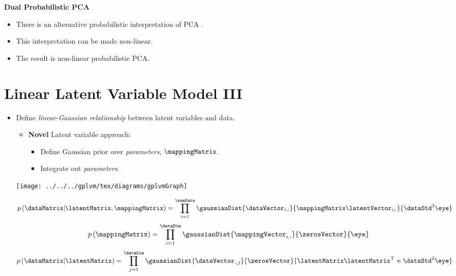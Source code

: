 \textbf{Dual Probabilistic PCA}
\begin{itemize}
\item There is an alternative probabilistic interpretation of PCA \cite{Lawrence:pnpca05}.
\item This interpretation can be made non-linear.
\item The result is non-linear probabilistic PCA.
\end{itemize}

\section{Linear Latent Variable Model III}



\begin{itemize}
\item Define \emph{linear-Gaussian relationship} between latent variables
and data.

\begin{itemize}
\item \textbf{Novel} Latent variable approach:

\begin{itemize}
\item Define Gaussian prior over \emph{parameters}, $\mappingMatrix$.
\item Integrate out \emph{parameters}.
\end{itemize}
\end{itemize}

\begin{center}
\texttt{[image: ../../../gplvm/tex/diagrams/gplvmGraph]}
\par\end{center}

\begin{center}
\[
p\left(\dataMatrix|\latentMatrix,\mappingMatrix\right)=\prod_{i=1}^{\numData}\gaussianDist{\dataVector_{i,:}}{\mappingMatrix\latentVector_{i,:}}{\dataStd^{2}\eye}\]
\[
p\left(\mappingMatrix\right)=\prod_{i=1}^{\dataDim}\gaussianDist{\mappingVector_{i,:}}{\zerosVector}{\eye}\]
\[
p\left(\dataMatrix|\latentMatrix\right)=\prod_{j=1}^{\dataDim}\gaussianDist{\dataVector_{:,j}}{\zerosVector}{\latentMatrix\latentMatrix^{\mathrm{T}}+\dataStd^{2}\eye}\]

\par\end{center}

\end{itemize}

